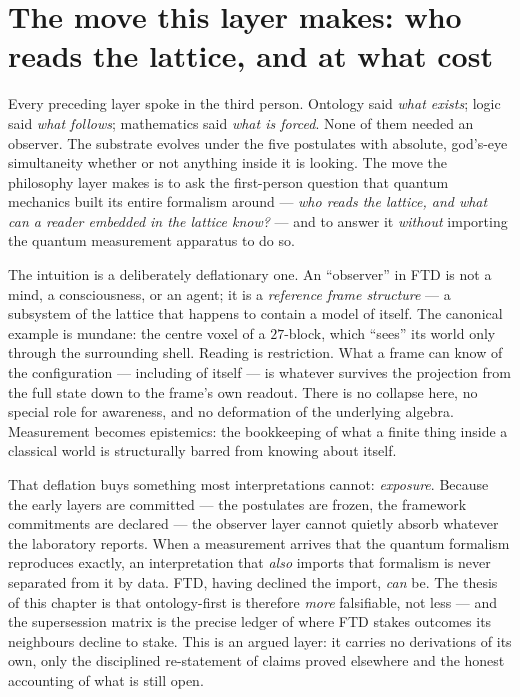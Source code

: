 \section*{The move this layer makes: who reads the lattice, and at what cost}

Every preceding layer spoke in the third person. Ontology said \emph{what
exists}; logic said \emph{what follows}; mathematics said \emph{what is forced}.
None of them needed an observer. The substrate evolves under the five postulates
with absolute, god's-eye simultaneity whether or not anything inside it is
looking. The move the philosophy layer makes is to ask the first-person
question that quantum mechanics built its entire formalism around --- \emph{who
reads the lattice, and what can a reader embedded in the lattice know?} --- and
to answer it \emph{without} importing the quantum measurement apparatus to do
so.

The intuition is a deliberately deflationary one. An ``observer'' in FTD is not
a mind, a consciousness, or an agent; it is a \emph{reference frame structure}
--- a subsystem of the lattice that happens to contain a model of itself. The
canonical example is mundane: the centre voxel of a $27$-block, which ``sees''
its world only through the surrounding shell. Reading is restriction. What a
frame can know of the configuration --- including of itself --- is whatever
survives the projection from the full state down to the frame's own readout.
There is no collapse here, no special role for awareness, and no deformation of
the underlying algebra. Measurement becomes epistemics: the bookkeeping of what
a finite thing inside a classical world is structurally barred from knowing
about itself.

That deflation buys something most interpretations cannot: \emph{exposure}.
Because the early layers are committed --- the postulates are frozen, the
framework commitments are declared --- the observer layer cannot quietly absorb
whatever the laboratory reports. When a measurement arrives that the quantum
formalism reproduces exactly, an interpretation that \emph{also} imports that
formalism is never separated from it by data. FTD, having declined the import,
\emph{can} be. The thesis of this chapter is that ontology-first is therefore
\emph{more} falsifiable, not less --- and the supersession matrix is the precise
ledger of where FTD stakes outcomes its neighbours decline to stake. This is an
argued layer: it carries no derivations of its own, only the disciplined
re-statement of claims proved elsewhere and the honest accounting of what is
still open.


